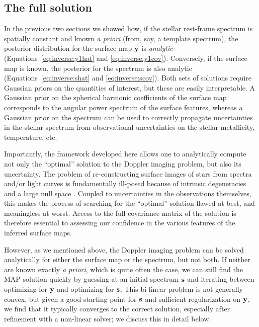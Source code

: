 \documentclass[modern]{aastex62}
\begin{document}
\subsection{The full solution}
In the previous two sections we showed how, if the stellar
rest-frame spectrum is spatially constant and known \emph{a priori} 
(from, say, a template spectrum), the posterior distribution
for the surface map ${\mathbf{y}}$ is \emph{analytic} 
(Equations~\ref{eq:inverse:y1hat}
and \ref{eq:inverse:y1cov}). Conversely, if the surface map is known,
the posterior for the spectrum is also analytic 
(Equations~\ref{eq:inverse:shat} and \ref{eq:inverse:scov}). Both sets of
solutions require Gaussian priors on the quantities of interest, but these
are easily interpretable. A Gaussian prior on
the spherical harmonic coefficients of the surface map corresponds 
to the angular power spectrum of the surface features, whereas a Gaussian
prior on the spectrum can be used to correctly propagate uncertainties in
the stellar spectrum from observational uncertainties on the stellar
metallicity, temperature, etc.

Importantly, the framework developed here allows one to analytically
compute not only the ``optimal'' solution to the Doppler imaging problem,
but also its uncertainty. The problem of re-constructing surface images
of stars from spectra and/or light curves is fundamentally ill-posed because
of intrinsic degeneracies and a large null space
\citep[e.g.,][]{Luger2019} . Coupled to uncertainties in
the observations themselves, this makes the process of searching for the
``optimal'' solution flawed at best, and meaningless at worst. Access to the
full covariance matrix of the solution is therefore essential to assessing our
confidence in the various features of the inferred surface maps.

However, as we mentioned above, the Doppler imaging problem can be solved
analytically for either the surface map or the spectrum, but not both. If
neither are known exactly \emph{a priori}, which is quite often the case,
we can still find the MAP solution quickly by guessing at an initial
spectrum ${\mathbf{s}}$ and iterating between optimizing for ${\mathbf{y}}$ and
optimizing for ${\mathbf{s}}$. This bi-linear problem is not generally convex,
but given a good starting point for ${\mathbf{s}}$ and sufficient regularization
on ${\mathbf{y}}$, we find that it typically converges to the correct solution,
especially after refinement with a non-linear solver;
we discuss this in detail below.
\end{document}
